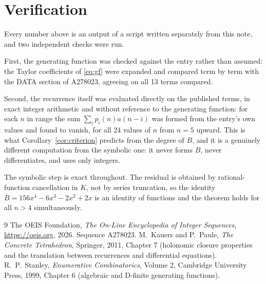 \documentclass[11pt,a4paper]{article}
\theoremstyle{plain}
\theoremstyle{definition}
\begin{document}
\section{Verification}

Every number above is an output of a script written separately from this note, and two
independent checks were run.

First, the generating function was checked against the entry rather than assumed: the
Taylor coefficients of \eqref{eq:gf} were expanded and compared term by term with the DATA
section of A278023, agreeing on all 13 terms compared.

Second, the recurrence itself was evaluated directly on the published terms, in exact
integer arithmetic and without reference to the generating function: for each $n$ in range
the sum $\sum_{i}p_{i}(n)a(n-i)$ was formed from the entry's own values and found to
vanish, for all 24 values of $n$ from $n=5$ upward. This is what
Corollary~\ref{cor:criterion} predicts from the degree of $B$, and it is a genuinely
different computation from the symbolic one: it never forms $B$, never differentiates, and
uses only integers.

The symbolic step is exact throughout. The residual is obtained by rational-function
cancellation in $K$, not by series truncation, so the identity $B=156 x^{4} - 6 x^{3} - 2 x^{2} + 2 x$ is an
identity of functions and the theorem holds for all $n>4$ simultaneously.

\begin{thebibliography}{9}
 The OEIS Foundation, \emph{The On-Line Encyclopedia of Integer Sequences},
\url{https://oeis.org}, 2026. Sequence A278023.
 M.~Kauers and P.~Paule, \emph{The Concrete Tetrahedron}, Springer, 2011,
Chapter 7 (holonomic closure properties and the translation between recurrences and
differential equations).
 R.~P.~Stanley, \emph{Enumerative Combinatorics}, Volume 2, Cambridge
University Press, 1999, Chapter 6 (algebraic and D-finite generating functions).
\end{thebibliography}
\end{document}
